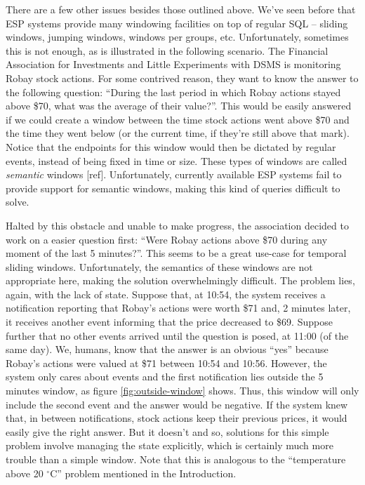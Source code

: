 \documentclass{report}
\begin{document}
There are a few other issues besides those outlined above. We've seen
before that ESP systems provide many windowing facilities on top of
regular SQL -- sliding windows, jumping windows, windows per groups,
etc. Unfortunately, sometimes this is not enough, as is illustrated in
the following scenario. The Financial Association for Investments and
Little Experiments with DSMS is monitoring Robay stock actions. For
some contrived reason, they want to know the answer to the following
question: ``During the last period in which Robay actions stayed above
\$70, what was the average of their value?''. This would be easily
answered if we could create a window between the time stock actions
went above \$70 and the time they went below (or the current time, if
they're still above that mark). Notice that the endpoints for this
window would then be dictated by regular events, instead of being
fixed in time or size. These types of windows are called
\emph{semantic} windows [ref]. Unfortunately, currently available ESP
systems fail to provide support for semantic windows, making this kind
of queries difficult to solve.

Halted by this obstacle and unable to make progress, the association
decided to work on a easier question first: ``Were Robay actions above
\$70 during any moment of the last 5 minutes?''. This seems to be a
great use-case for temporal sliding windows. Unfortunately, the
semantics of these windows are not appropriate here, making the
solution overwhelmingly difficult. The problem lies, again, with the
lack of state. Suppose that, at 10:54, the system receives a
notification reporting that Robay's actions were worth \$71 and, 2
minutes later, it receives another event informing that the price
decreased to \$69. Suppose further that no other events arrived until
the question is posed, at 11:00 (of the same day). We, humans, know
that the answer is an obvious ``yes'' because Robay's actions were
valued at \$71 between 10:54 and 10:56. However, the system only cares
about events and the first notification lies outside the 5 minutes
window, as figure \ref{fig:outside-window} shows. Thus, this window
will only include the second event and the answer would be
negative. If the system knew that, in between notifications, stock
actions keep their previous prices, it would easily give the right
answer. But it doesn't and so, solutions for this simple problem
involve managing the state explicitly, which is certainly much more
trouble than a simple window. Note that this is analogous to the
``temperature above 20 $^{\circ}$C'' problem mentioned in the
Introduction.
\end{document}
